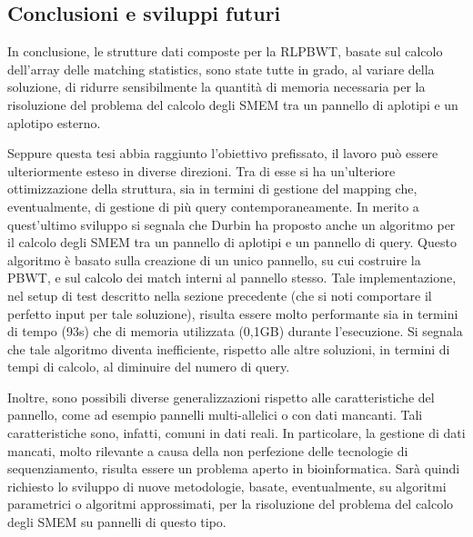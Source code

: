 \documentclass[a4paper,11pt, oneside,italian]{article}
\begin{document}
\subsection*{Conclusioni e sviluppi futuri}
In conclusione, le strutture dati composte per la RLPBWT, basate sul calcolo
dell'array delle matching statistics, sono state tutte in
grado, al variare della soluzione, di ridurre sensibilmente la 
quantità di memoria necessaria per la risoluzione del 
problema del calcolo degli SMEM tra un pannello di aplotipi e un aplotipo
esterno.  

Seppure questa tesi abbia raggiunto l'obiettivo prefissato, il lavoro può essere
ulteriormente esteso in diverse direzioni. Tra di esse si ha
un'ulteriore ottimizzazione della struttura, sia in termini 
di gestione del mapping che, eventualmente, di gestione di più query
contemporaneamente. In merito a quest'ultimo sviluppo si segnala che Durbin
ha proposto anche un algoritmo per il calcolo degli SMEM tra un pannello di
aplotipi e un pannello di query. Questo algoritmo è basato sulla creazione di un
unico pannello, su cui 
costruire la PBWT, e sul calcolo dei match interni al pannello stesso. Tale
implementazione, nel setup di test 
descritto nella sezione precedente (che si noti comportare il perfetto input per
tale soluzione), risulta essere molto performante sia in
termini di tempo (93s) che di memoria utilizzata (0,1GB) durante
l'esecuzione. Si segnala che tale algoritmo diventa inefficiente, rispetto alle
altre soluzioni, in termini di tempi di calcolo, al diminuire del numero di
query. 

Inoltre, sono possibili diverse generalizzazioni rispetto alle caratteristiche
del pannello, come ad esempio pannelli multi-allelici o con dati mancanti. Tali
caratteristiche sono, infatti, comuni in dati reali. In particolare, la gestione
di dati 
mancati, molto rilevante a causa della non perfezione delle tecnologie di
sequenziamento, risulta essere un problema aperto in bioinformatica. Sarà
quindi richiesto lo sviluppo di nuove metodologie, basate, eventualmente,
su algoritmi parametrici o algoritmi approssimati, per la risoluzione del
problema del calcolo degli SMEM su pannelli di questo tipo.
\end{document}
